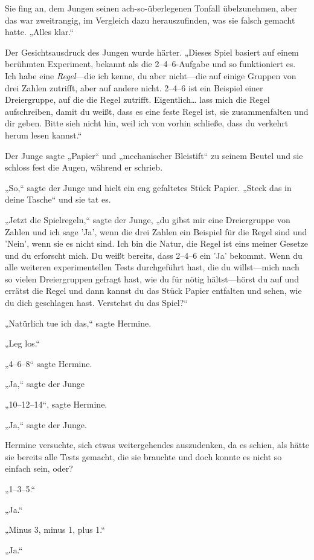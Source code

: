 {Sie fing an, dem Jungen seinen ach-so-überlegenen Tonfall übelzunehmen, aber das war zweitrangig, im Vergleich dazu herauszufinden, was sie falsch gemacht hatte. „Alles klar.“

Der Gesichtsausdruck des Jungen wurde härter. „Dieses Spiel basiert auf einem berühmten Experiment, bekannt als die 2–4–6-Aufgabe und so funktioniert es. Ich habe eine \emph{Regel}—die ich kenne, du aber nicht—die auf einige Gruppen von drei Zahlen zutrifft, aber auf andere nicht. 2–4–6 ist ein Beispiel einer Dreiergruppe, auf die die Regel zutrifft. Eigentlich… lass mich die Regel aufschreiben, damit du weißt, dass es eine feste Regel ist, sie zusammenfalten und dir geben. Bitte sieh nicht hin, weil ich von vorhin schließe, dass du verkehrt herum lesen kannst.“

Der Junge sagte „Papier“ und „mechanischer Bleistift“ zu seinem Beutel und sie schloss fest die Augen, während er schrieb.

„So,“ sagte der Junge und hielt ein eng gefaltetes Stück Papier. „Steck das in deine Tasche“ und sie tat es.

„Jetzt die Spielregeln,“ sagte der Junge, „du gibst mir eine Dreiergruppe von Zahlen und ich sage 'Ja', wenn die drei Zahlen ein Beispiel für die Regel sind und 'Nein', wenn sie es nicht sind. Ich bin die Natur, die Regel ist eins meiner Gesetze und du erforscht mich. Du weißt bereits, dass 2–4–6 ein 'Ja' bekommt. Wenn du alle weiteren experimentellen Tests durchgeführt hast, die du willst—mich nach so vielen Dreiergruppen gefragt hast, wie du für nötig hältst—hörst du auf und errätst die Regel und dann kannst du das Stück Papier entfalten und sehen, wie du dich geschlagen hast. Verstehst du das Spiel?“

„Natürlich tue ich das,“ sagte Hermine.

„Leg los.“

„4–6–8“ sagte Hermine.

„Ja,“ sagte der Junge

„10–12–14“, sagte Hermine.

„Ja,“ sagte der Junge.

Hermine versuchte, sich etwas weitergehendes auszudenken, da es schien, als hätte sie bereits alle Tests gemacht, die sie brauchte und doch konnte es nicht so einfach sein, oder?

„1–3–5.“

„Ja.“

„Minus 3, minus 1, plus 1.“

„Ja.“

}
